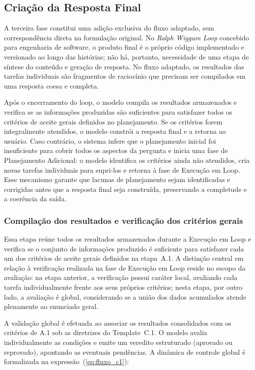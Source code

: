 \documentclass[a4paper,10pt,twocolumn]{article}
\begin{document}
\subsection{Criação da Resposta Final}

A terceira fase constitui uma adição exclusiva do fluxo adaptado, sem correspondência direta na formulação original. No \textit{Ralph Wiggum Loop} concebido para engenharia de software, o produto final é o próprio código implementado e versionado ao longo das histórias; não há, portanto, necessidade de uma etapa de síntese do conteúdo e geração de resposta. No fluxo adaptado, os resultados das tarefas individuais são fragmentos de raciocínio que precisam ser compilados em uma resposta coesa e completa.

Após o encerramento do loop, o modelo compila os resultados armazenados e verifica se as informações produzidas são suficientes para satisfazer todos os critérios de aceite gerais definidos no planejamento. Se os critérios forem integralmente atendidos, o modelo constrói a resposta final e a retorna ao usuário. Caso contrário, o sistema infere que o planejamento inicial foi insuficiente para cobrir todos os aspectos da pergunta e inicia uma fase de Planejamento Adicional: o modelo identifica os critérios ainda não atendidos, cria novas tarefas individuais para supri-los e retorna à fase de Execução em Loop. Esse mecanismo garante que lacunas de planejamento sejam identificadas e corrigidas antes que a resposta final seja construída, preservando a completude e a coerência da saída.


\subsubsection{Compilação dos resultados e verificação dos critérios gerais} \label{subsec:RespostaC1}

Essa etapa reúne todos os resultados armazenados durante a Execução em Loop e verifica se o conjunto de informações produzido é suficiente para satisfazer cada um dos critérios de aceite gerais definidos na etapa~A.1. A distinção central em relação à verificação realizada na fase de Execução em Loop reside no escopo da avaliação: na etapa anterior, a verificação possui caráter local, avaliando cada tarefa individualmente frente aos seus próprios critérios; nesta etapa, por outro lado, a avaliação é global, considerando se a união dos dados acumulados atende plenamente ao enunciado geral.

A validação global é efetuada ao associar os resultados consolidados com os critérios de A.1 sob as diretrizes do Template~C.1. O modelo avalia individualmente as condições e emite um veredito estruturado (aprovado ou reprovado), apontando as eventuais pendências. A dinâmica de controle global é formalizada na expressão~(\ref{eq:fluxo_c1}):
\end{document}

